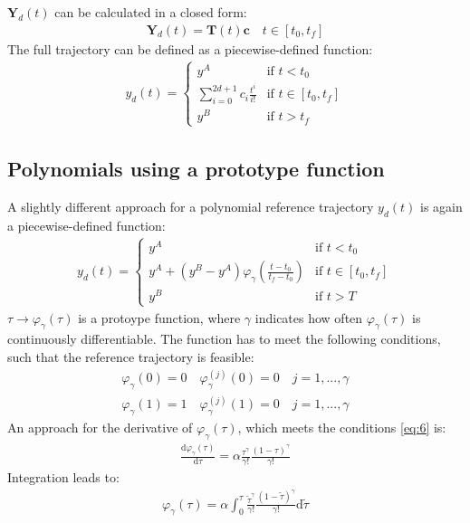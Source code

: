 \documentclass[a4paper,11pt,headings=standardclasses,parskip=half]{scrartcl}
\renewcommand{\d}{\mathrm{d}} %
\newcommand{\y}{\mathbf{y}}
\begin{document}
$\mathbf{Y}_d(t)$ can be calculated in a closed form:
\begin{align}
\label{eq:3}
\mathbf{Y}_d(t)=\mathbf{T}(t)\mathbf{c} \quad t \in [t_0,t_f] 
\end{align}
The full trajectory can be defined as a piecewise-defined function:
\begin{align}
y_d(t)=\begin{cases}y^A & \textrm{if } t<t_0 \\ \sum_{i=0}^{2d+1}c_i\frac{t^i}{i!} & \textrm{if } t\in [t_0,t_f] \\y^B & \textrm{if } t>t_f\end{cases}
\end{align}
\subsection{Polynomials using a prototype function}
A slightly different approach for a polynomial reference trajectory $y_d(t)$ is again a piecewise-defined function:
\begin{align}
\label{eq:5}
y_d(t) = \begin{cases} y^A &\textrm{if } t<t_0 \\ y^A + (y^B-y^A)\varphi_\gamma\left(\frac{t-t_0}{t_f-t_0}\right) &\textrm{if } t \in [t_0, t_f] \\y^B &\textrm{if } t>T\end{cases}
\end{align}
$\tau \rightarrow \varphi_\gamma(\tau)$ is a protoype function, where $\gamma$ indicates how often $\varphi_\gamma(\tau)$ is continuously differentiable. The function has to meet the following conditions, such that the reference trajectory is feasible:
\begin{subequations}
\label{eq:6}
\begin{align}
\varphi_\gamma(0)=0 \quad \varphi^{(j)}_\gamma(0)=0 \quad j = 1,...,\gamma \\
\varphi_\gamma(1)=1 \quad \varphi^{(j)}_\gamma(1)=0 \quad j = 1,...,\gamma 
\end{align}
\end{subequations}
An approach for the derivative of $\varphi_\gamma(\tau)$, which meets the conditions \eqref{eq:6} is:
\begin{align}
\frac{\d \varphi_\gamma(\tau)}{\d \tau} = \alpha \frac{\tau^{\gamma}}{\gamma!}\frac{(1-\tau)^{\gamma}}{\gamma!}
\end{align}
Integration leads to:
\begin{align}
\varphi_\gamma(\tau) = \alpha \int_0^\tau\frac{\tilde{\tau}^{\gamma}}{\gamma!}\frac{(1-\tilde{\tau})^{\gamma}}{\gamma!} \d \tilde{\tau}
\end{align}
\end{document}
